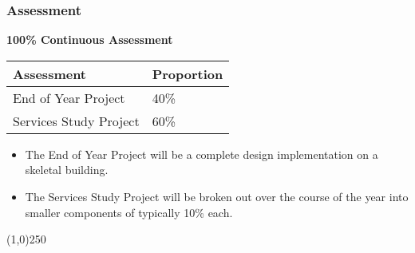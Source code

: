 \begin{frame}
\frametitle{Assessment}
\textbf{100\% Continuous Assessment}
\begin{table}[htp]
	\centering
		\begin{tabular}{|l|l|}
			\hline
			\textbf{Assessment} & \textbf{Proportion} \\
			\hline
			End of Year Project &		40\% \\
			Services Study Project &   	60\% \\
			\hline
		\end{tabular}
		\label{tab:Assessments}
\end{table}
\begin{itemize}
	\item The End of Year Project will be a complete design implementation on a skeletal building.\\
	\item The Services Study Project will be broken out over the course of the year into smaller components of typically 10\% each.
\end{itemize}
\end{frame}
\begin{center}\line(1,0){250}\end{center}





